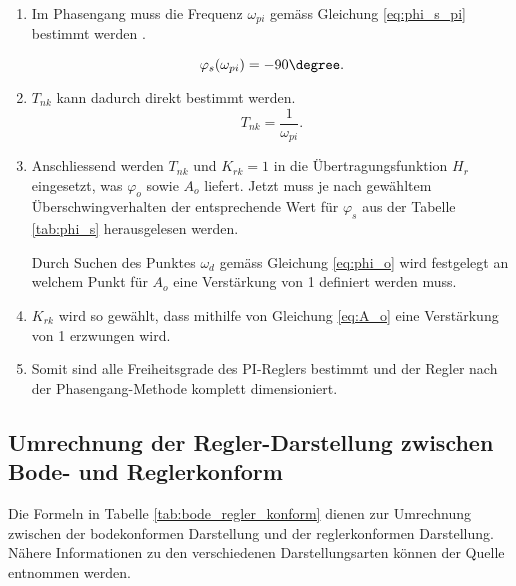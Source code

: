\begin{enumerate}
    \item
        Im  Phasengang  muss  die Frequenz  $\omega_{pi}$  gem\"ass  Gleichung
        \ref{eq:phi_s_pi} bestimmt werden \footnotemark[1].

        \begin{equation} \label{eq:phi_s_pi}
            \varphi_s(\omega_{pi})=-90 \degree.
        \end{equation}

    \item
        $T_{nk}$ kann dadurch direkt bestimmt werden.
        \begin{equation} \label{eq:Tnk_pi}
            T_{nk}=\frac{1}{\omega_{pi}}.
        \end{equation}

    \item
        Anschliessend    werden    $T_{nk}$     und    $K_{rk}=1$    in    die
        \"Ubertragungsfunktion $H_r$  eingesetzt, was $\varphi_o$  sowie $A_o$
        liefert. Jetzt  muss  je  nach gew\"ahltem  \"Uberschwingverhalten  der
        entsprechende Wert  f\"ur $\varphi_s$ aus der  Tabelle \ref{tab:phi_s}
        herausgelesen werden.

        Durch Suchen des Punktes  $\omega_d$ gem\"ass Gleichung \ref{eq:phi_o}
        wird festgelegt an  welchem Punkt f\"ur $A_o$ eine  Verst\"arkung von 1
        definiert werden muss.

    \item
        $K_{rk}$ wird  so gew\"ahlt, dass mithilfe  von Gleichung \ref{eq:A_o}
        eine Verst\"arkung von 1 erzwungen wird.

    \item
        Somit sind alle Freiheitsgrade des  PI-Reglers bestimmt und der Regler
        nach der Phasengang-Methode komplett dimensioniert.
\end{enumerate}

\newpage
\subsection{Umrechnung der Regler-Darstellung zwischen Bode- und Reglerkonform}

Die    Formeln   in    Tabelle   \ref{tab:bode_regler_konform}    dienen   zur
Umrechnung  zwischen der  bodekonformen  Darstellung  und der  reglerkonformen
Darstellung. N\"ahere  Informationen  zu den  verschiedenen  Darstellungsarten
k\"onnen der Quelle \cite{regelungstechnik:zellweger} entnommen werden.

